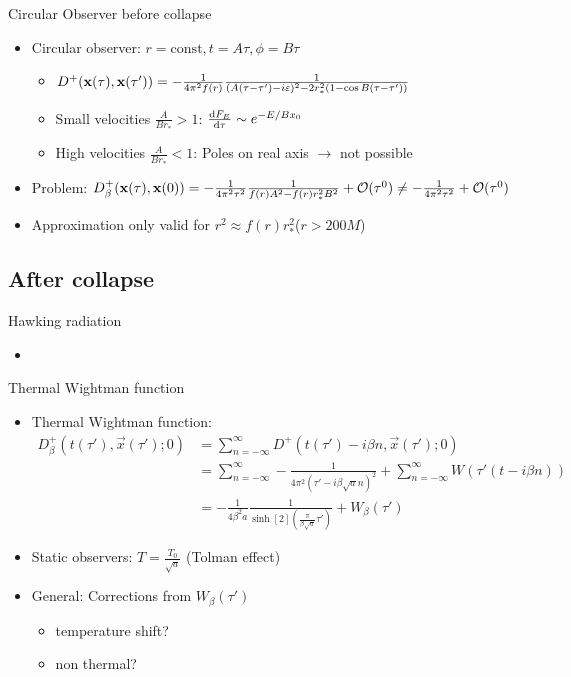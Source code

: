 \documentclass{beamer}
\renewcommand{\va}[1]{\vec{#1}}
\begin{document}
\begin{frame}{Circular Observer before collapse}
\begin{itemize}
	\item Circular observer: \(r = \mathrm{const}, t = A\tau, \phi = B \tau\)
	\begin{itemize}
		\item \(D^+(\vb{x}(\tau), \vb{x}(\tau')) = -\frac{1}{4\pi^2f(r)} \frac{1}{(A(\tau-\tau')-i\varepsilon)^2 - 2r_*^2 (1 - \cos{B(\tau-\tau')})}\)
		\item Small velocities \(\frac{A}{Br_*} > 1\): \(\dv{F_E}{\tau} \sim e^{-E/B x_0}\)
		\item High velocities \(\frac{A}{Br_*} < 1\): Poles on real axis \(\to\) not possible
	\end{itemize}
	\item Problem: \(D^+_\beta(\vb{x}(\tau),\vb{x}(0)) = -\frac{1}{4\pi^2 \tau^2} \frac{1}{f(r) A^2 - f(r)r_*^2 B^2} + \order*{\tau^0}\neq -\frac{1}{4\pi^2 \tau^2} + \order*{\tau^0}\)
	\item Approximation only valid for \(r^2 \approx f(r)r_*^2\)\hspace{1cm}(\(r > 200 M\))
\end{itemize}
\end{frame}

\subsection{After collapse}
\begin{frame}{Hawking radiation}
\begin{itemize}
	\item 
\end{itemize}
\end{frame}

\begin{frame}{Thermal Wightman function}

\begin{itemize}
	\item Thermal Wightman function:
	\begin{align*}
		D_\beta^+(t(\tau'),\va{x}(\tau');0) &= \sum_{n=-\infty}^\infty D^+(t(\tau') - i \beta n,\va{x}(\tau');0)\\
			&= \sum_{n=-\infty}^\infty -\frac{1}{4\pi^2 (\tau' - i\beta \sqrt{a} n)^2} + \sum_{n=-\infty}^\infty W(\tau'(t - i\beta n))\\
			&= -\frac{1}{4\beta^2 a} \frac{1}{\sinh[2](\frac{\pi}{\beta \sqrt{a}} \tau')} + W_\beta(\tau')
	\end{align*}
	\item Static observers: \(T = \frac{T_0}{\sqrt{a}}\) (Tolman effect)
	\item General: Corrections from \(W_\beta(\tau')\)
	\begin{itemize}
		\item temperature shift?
		\item non thermal?
	\end{itemize}
\end{itemize}
\end{frame}
\end{document}
